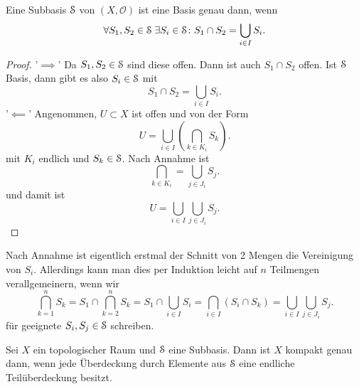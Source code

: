 \begin{theorem}
    Eine Subbasis $\mathcal{S}$ von  $(X, \mathcal{O})$ ist eine Basis genau dann, wenn
    \[
    \forall S_1, S_2 \in \mathcal{S} \;\exists S_i \in \mathcal{S} \colon S_1 \cap S_2 = \bigcup_{i \in I} S_i
    .\] 
\end{theorem}
\begin{proof}
'$\implies$'    Da $S_1,S_2 \in \mathcal{S}$ sind diese offen. Dann ist auch $S_1\cap S_2$ offen. Ist $\mathcal{S}$ Basis, dann gibt es also  $S_i \in  \mathcal{S}$ mit 
\[
S_1 \cap  S_2 = \bigcup_{i \in  I} S_i
.\] 
'$\impliedby$' Angenommen, $U\subset X$ ist offen und von der Form
\[
    U = \bigcup_{i \in  I} \left( \bigcap_{k\in K_i} S_k \right) 
.\] 
mit $K_i$ endlich und  $S_k \in  \mathcal{S}$. Nach Annahme ist
\[
\bigcap_{k\in K_i} = \bigcup_{j\in J_i} S_j  
.\] 
und damit ist
\[
U = \bigcup_{i\in I} \bigcup_{j\in J_i} S_j  
.\] 
\end{proof}
\begin{remark}
    Nach Annahme ist eigentlich erstmal der Schnitt von 2 Mengen die Vereinigung von $S_i$. Allerdings kann man dies per Induktion leicht auf  $n$ Teilmengen verallgemeinern, wenn wir
     \[
         \bigcap_{k=1}^n S_k = S_1 \cap  \bigcap_{k=2}^{n} S_k = S_1 \cap \bigcup_{i\in I} S_i = \bigcap_{i\in I} (S_i \cap S_k) = \bigcup_{i\in I} \bigcup_{j\in J_i} S_j  
    .\]
    für geeignete $S_i, S_j\in \mathcal{S}$ schreiben.
\end{remark}
\begin{theorem}
    \label{thm:alexander}
    Sei $X$ ein topologischer Raum und  $\mathcal{S}$ eine Subbasis. Dann ist  $X$ kompakt genau dann, wenn jede Überdeckung durch Elemente aus  $\mathcal{S}$ eine endliche Teilüberdeckung besitzt.
\end{theorem}
